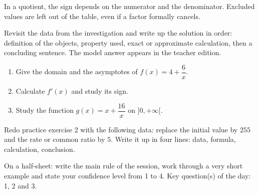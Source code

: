 \begin{traceecrite}In a quotient, the sign depends on the numerator and the denominator. Excluded values are left out of the table, even if a factor formally cancels.\end{traceecrite}

\begin{exemple}
Revisit the data from the investigation and write up the solution in order: definition of the objects, property used, exact or approximate calculation, then a concluding sentence. The model answer appears in the teacher edition.
\end{exemple}
\enseignant{The critical values are $-3,0,2$. The solution is $[-3,0[\cup[2,+\infty[$.}

\begin{exercice}[-- essential]
\begin{enumerate}\item Give the domain and the asymptotes of $f(x)=4+\dfrac{6}x$.\item Calculate $f'(x)$ and study its sign.\item Study the function $g(x)=x+\dfrac{16}x$ on $]0,+\infty[$.\end{enumerate}
\end{exercice}


\begin{dm}Redo practice exercise 2 with the following data: replace the initial value by $255$ and the rate or common ratio by $5$. Write it up in four lines: data, formula, calculation, conclusion.\end{dm}

\begin{sortie}On a half-sheet: write the main rule of the session, work through a very short example and state your confidence level from 1 to 4. Key question(s) of the day: 1, 2 and 3.\end{sortie}

